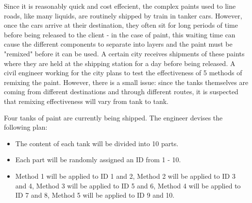 \documentclass[addpoints]{examsetup}\usepackage[]{graphicx}\usepackage[]{color}
\begin{document}
\begin{questions}

\newpage

\question
Since it is reasonably quick and cost effecient, the complex paints used to line roads, like many liquids, are routinely shipped by train in tanker cars.
However, once the cars arrive at their destination, they often sit for long periods of time before being released to the client - in the case of paint, this waiting time can cause the different components to separate into layers and the paint must be "remixed" before it can be used.
A certain city receives shipments of these paints where they are held at the shipping station for a day before being released.
A civil engineer working for the city plans to test the effectiveness of 5 methods of remixing the paint.
However, there is a small issue: since the tanks themselves are coming from different destinations and through different routes, it is suspected that remixing effectiveness will vary from tank to tank.

Four tanks of paint are currently being shipped. The engineer devises the following plan:

\begin{itemize}
   \item The content of each tank will be divided into 10 parts.
   \item Each part will be randomly assigned an ID from 1 - 10.
   \item Method 1 will be applied to ID 1 and 2, Method 2 will be applied to ID 3 and 4, Method 3 will be applied to ID 5 and 6, Method 4 will be applied to ID 7 and 8, Method 5 will be applied to ID 9 and 10.
\end{itemize}


\end{questions}
\end{document}
